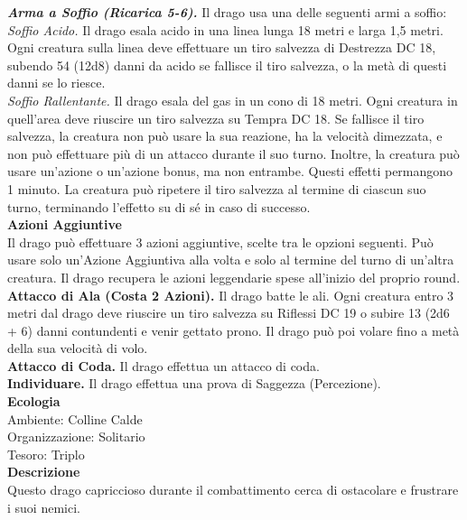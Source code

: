 \begin{multicols}{2}
\emph{\textbf{Arma a Soffio (Ricarica 5-6).}} Il drago usa una delle seguenti armi a soffio:\\
\emph{Soffio Acido.} Il drago esala acido in una linea lunga 18 metri e larga 1,5 metri. Ogni creatura sulla linea deve effettuare un tiro salvezza di Destrezza DC 18, subendo 54 (12d8) danni da acido se fallisce il tiro salvezza, o la metà di questi danni se lo riesce.\\
\emph{Soffio Rallentante.} Il drago esala del gas in un cono di 18 metri. Ogni creatura in quell'area deve riuscire un tiro salvezza su Tempra DC 18. Se fallisce il tiro salvezza, la creatura non può usare la sua reazione, ha la velocità dimezzata, e non può effettuare più di un attacco durante il suo turno. Inoltre, la creatura può usare un'azione o un'azione bonus, ma non entrambe. Questi effetti permangono 1 minuto. La creatura può ripetere il tiro salvezza al termine di ciascun suo turno, terminando l'effetto su di sé in caso di successo.\\
\textbf{Azioni Aggiuntive}\\
Il drago può effettuare 3 azioni aggiuntive, scelte tra le opzioni seguenti. Può usare solo un'Azione Aggiuntiva alla volta e solo al termine del turno di un'altra creatura. Il drago recupera le azioni leggendarie spese all'inizio del proprio round.\\
\textbf{Attacco di Ala (Costa 2 Azioni).} Il drago batte le ali. Ogni creatura entro 3 metri dal drago deve riuscire un tiro salvezza su Riflessi DC 19 o subire 13 (2d6 + 6) danni contundenti e venir gettato prono. Il drago può poi volare fino a metà della sua velocità di volo.\\
\textbf{Attacco di Coda.} Il drago effettua un attacco di coda.\\
\textbf{Individuare.} Il drago effettua una prova di Saggezza (Percezione).\\
\textbf{Ecologia}\\
Ambiente: Colline Calde\\
Organizzazione: Solitario\\
Tesoro: Triplo\\
\textbf{Descrizione}\\
Questo drago capriccioso durante il combattimento cerca di ostacolare e frustrare i suoi nemici.\\



\end{multicols}

